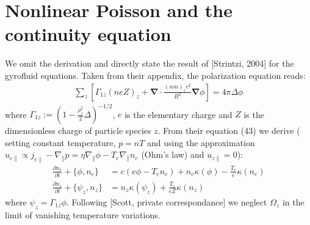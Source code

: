 \documentclass[a4paper,12pt]{scrartcl}
\renewcommand{\vec}[1]{{\mathbf{#1}}}
\begin{document}
\section{Nonlinear Poisson and the continuity equation}
We omit the derivation and directly state the result of [Strintzi, 2004] for 
the gyrofluid equations. Taken
from their appendix, the polarization equation reads:%
\begin{align}
    \sum_z\left[ \Gamma_{1z} (neZ)_z + 
    \vec \nabla \cdot \frac{(nm)_zc^2}{B^2}\vec\nabla \phi\right] = 4\pi \Delta \phi
    \label{eq:poisson}
\end{align}
where $\Gamma_{1z} := \left( 1-\frac{\rho_z^2}{2}\Delta \right)^{-1/2}$,
$e$ is the elementary charge and $Z$ is the dimensionless charge of particle
species $z$.
From their equation (43)  we derive ( setting constant temperature, $p = nT$ 
and using the approximation  
$u_{e\parallel} \propto j_{e\parallel} - \nabla_\parallel p 
        = \eta \nabla_\parallel\phi - T_e\nabla_\parallel n_e$
(Ohm's law)
and $u_{z\parallel} =0$):
\begin{subequations}
\begin{align}
    \frac{\partial n_e}{\partial t} + \{\phi, n_e\} &= c(e \phi - T_e n_e) + n_e\kappa(\phi) -
    \frac{T_e}{e}\kappa(n_e)  \\
    \frac{\partial n_z}{\partial t} + \{\psi_z, n_z\} &= n_z\kappa(\psi_z) +
    \frac{T_z}{eZ}\kappa(n_z) 
    \label{}
\end{align}
\end{subequations}
where $\psi_z = \Gamma_{1z} \phi$. Following [Scott, private correspondance] we 
 neglect $\Omega_z$ in the limit of vanishing temperature variations.
\end{document}
